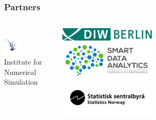 \begin{frame}\frametitle{Partners}\vspace{1.0cm}

\begin{columns}[t]
	\centering \\
  \includegraphics[width=0.3\textwidth]{material/crop-cooperation-ins.png} \\\vspace{-0.5cm}
  \footnotesize{Institute for \\ Numerical Simulation}\vspace{0.3cm}



	\centering
	\includegraphics[width=0.45\textwidth]{material/crop-cooperation-diw.png}\\
	\includegraphics[width=0.45\textwidth]{material/crop-cooperation-sda.png}\\

	\includegraphics[width=0.45\textwidth]{material/crop-cooperation-ssb.png}\\


\end{columns}
\end{frame}
